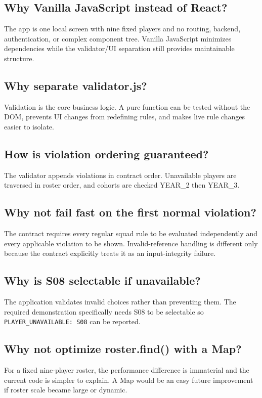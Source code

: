 \documentclass[11pt,a4paper]{article}
\begin{document}
\subsection{Why Vanilla JavaScript instead of React?}
The app is one local screen with nine fixed players and no routing, backend, authentication, or complex component tree. Vanilla JavaScript minimizes dependencies while the validator/UI separation still provides maintainable structure.

\subsection{Why separate validator.js?}
Validation is the core business logic. A pure function can be tested without the DOM, prevents UI changes from redefining rules, and makes live rule changes easier to isolate.

\subsection{How is violation ordering guaranteed?}
The validator appends violations in contract order. Unavailable players are traversed in roster order, and cohorts are checked YEAR\_2 then YEAR\_3.

\subsection{Why not fail fast on the first normal violation?}
The contract requires every regular squad rule to be evaluated independently and every applicable violation to be shown. Invalid-reference handling is different only because the contract explicitly treats it as an input-integrity failure.

\subsection{Why is S08 selectable if unavailable?}
The application validates invalid choices rather than preventing them. The required demonstration specifically needs S08 to be selectable so \texttt{PLAYER\_UNAVAILABLE: S08} can be reported.

\subsection{Why not optimize roster.find() with a Map?}
For a fixed nine-player roster, the performance difference is immaterial and the current code is simpler to explain. A Map would be an easy future improvement if roster scale became large or dynamic.
\end{document}
